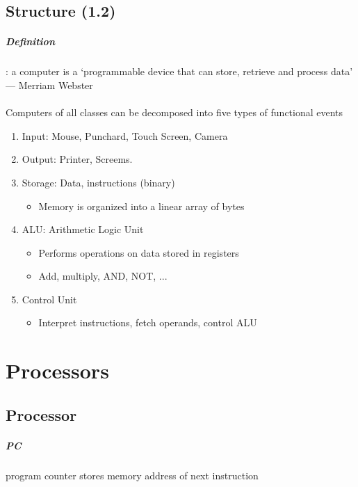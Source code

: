 \documentclass[12pt]{report}
\begin{document}
  \section{Structure (1.2)}
    \paragraph{Definition}: a computer is a `programmable device that can
    store, retrieve and process data' \\ --- Merriam Webster
    \\
    \\
    Computers of all classes can be decomposed into five types of functional
    events
    \begin{enumerate}
      \item Input: Mouse, Punchard, Touch Screen, Camera
      \item Output: Printer, Screems.
      \item Storage: Data, instructions (binary)
      \begin{itemize}
        \item Memory is organized into a linear array of bytes
      \end{itemize}
      \item ALU: Arithmetic Logic Unit
      \begin{itemize}
        \item Performs operations on data stored in registers
        \item Add, multiply, AND, NOT, ...
      \end{itemize}
      \item Control Unit
      \begin{itemize}
        \item Interpret instructions, fetch operands, control ALU
      \end{itemize}
    \end{enumerate}

\chapter{Processors}
  \section{Processor}
    \paragraph{PC} program counter stores memory address of next instruction
\end{document}
